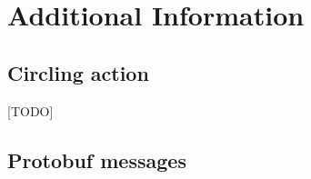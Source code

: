 \chapter{Additional Information}

\section{Circling action \label{sec:circling}}
[TODO] 

\section{Protobuf messages \label{sec:protobufMessages}}

%
%
%
%
%
%
%
%
%
